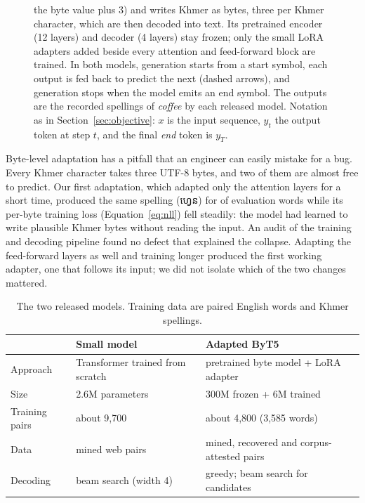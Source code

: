 \documentclass[10pt,a4paper,twocolumn]{article}
\newcommand{\km}[1]{{\khmerfont #1}}
\begin{document}
\begin{figure}[p]
{the byte value plus 3) and writes Khmer as bytes, three per Khmer character, which are then decoded into text. Its
pretrained encoder (12 layers) and decoder (4 layers) stay frozen; only the small LoRA adapters added beside every
attention and feed-forward block are trained. In both models, generation starts from a start symbol, each output is
fed back to predict the next (dashed arrows), and generation stops when the model emits an end symbol. The outputs
are the recorded spellings of \emph{coffee} by each released model. Notation as in Section~\ref{sec:objective}: $x$ is the
input sequence, $y_t$ the output token at step $t$, and the final \emph{end} token is $y_T$.}
\label{fig:arch}
\end{figure}

Byte-level adaptation has a pitfall that an engineer can easily mistake for a bug. Every Khmer character takes
three UTF-8 bytes, and two of them are almost free to predict. Our first adaptation, which adapted only the attention
layers for a short time, produced the same spelling (\km{ហ្វេន}) for  of  evaluation
words while its per-byte training loss (Equation~\eqref{eq:nll}) fell steadily: the model had learned to write plausible Khmer bytes without reading
the input. An audit of the training and decoding pipeline found no defect that explained the collapse. Adapting the
feed-forward layers as well and training longer produced the first working adapter, one that follows its input; we
did not isolate which of the two changes mattered.

\begin{table}[t]
\centering\small
\caption{The two released models. Training data are paired English words and Khmer spellings.}
\label{tab:models}
\setlength{\tabcolsep}{3pt}
\begin{tabularx}{\columnwidth}{@{}lLL@{}}
\toprule
 & Small model & Adapted ByT5 \\
\midrule
Approach & Transformer trained from scratch & pretrained byte model + LoRA adapter \\
Size & 2.6M parameters & 300M frozen + 6M trained \\
Training pairs & about 9,700 & about 4,800 (3,585 words) \\
Data & mined web pairs & mined, recovered and corpus-attested pairs \\
Decoding & beam search (width 4) & greedy; beam search for candidates \\
\bottomrule
\end{tabularx}
\end{table}
\end{document}
